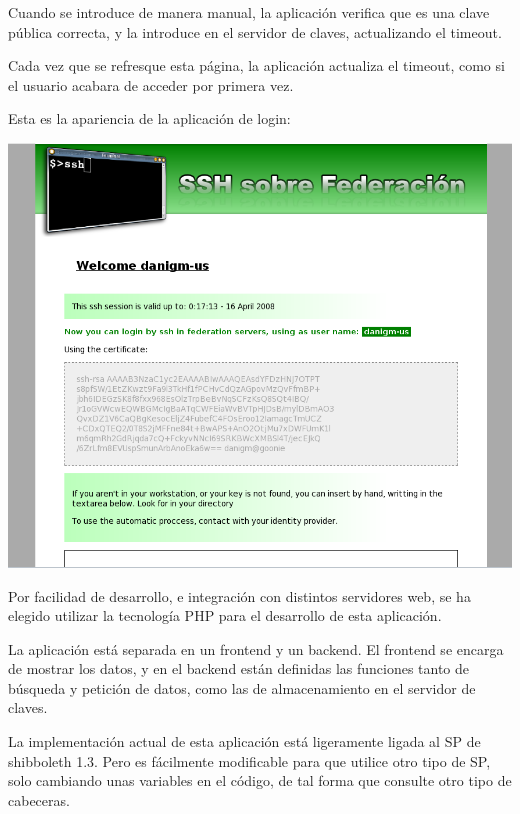     Cuando se introduce de manera manual, la aplicación verifica que es una
    clave pública correcta, y la introduce en el servidor de claves,
    actualizando el timeout.

    Cada vez que se refresque esta página, la aplicación actualiza el
    timeout, como si el usuario acabara de acceder por primera vez.

    Esta es la apariencia de la aplicación de login:
     
    \begin{center}
        \includegraphics[width=\textwidth]{img/sshApp.png}
    \end{center}
     
    Por facilidad de desarrollo, e integración con distintos servidores
    web, se ha elegido utilizar la tecnología PHP para el desarrollo de
    esta aplicación.

    La aplicación está separada en un frontend y un backend. El frontend se
    encarga de mostrar los datos, y en el backend están definidas las
    funciones tanto de búsqueda y petición de datos, como las de
    almacenamiento en el servidor de claves.

    La implementación actual de esta aplicación está ligeramente ligada al
    SP de shibboleth 1.3. Pero es fácilmente modificable para que utilice
    otro tipo de SP, solo cambiando unas variables en el código, de tal
    forma que consulte otro tipo de cabeceras.

